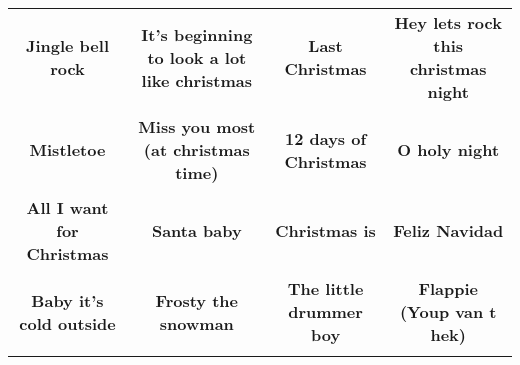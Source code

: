 \documentclass[12pt]{article} \usepackage{eso-pic, graphicx}
\newcommand{\background}[1]{%
\AddToShipoutPictureBG*{\texttt{[image: \#1]}}
}
\begin{document}
\tabcolsep=30.2pt \renewcommand{\arraystretch}{4.5}   \vspace*{4.3cm} \begin{center}  \begin{tabular}{c c c c}
\parbox{3cm}{\centering \textbf{Jingle bell rock}}& 
\parbox{3cm}{\centering \textbf{It’s beginning to look a lot like christmas}}& 
\parbox{3cm}{\centering \textbf{Last Christmas}}& 
\parbox{3cm}{\centering \textbf{Hey lets rock this christmas night}}\\ \\ 
\parbox{3cm}{\centering \textbf{Mistletoe}}& 
\parbox{3cm}{\centering \textbf{Miss you most (at christmas time)}}& 
\parbox{3cm}{\centering \textbf{12 days of Christmas}}& 
\parbox{3cm}{\centering \textbf{O holy night}}\\ \\ 
\parbox{3cm}{\centering \textbf{All I want for Christmas}}& 
\parbox{3cm}{\centering \textbf{Santa baby}}& 
\parbox{3cm}{\centering \textbf{Christmas is}}& 
\parbox{3cm}{\centering \textbf{Feliz Navidad}}\\ \\ 
\parbox{3cm}{\centering \textbf{Baby it’s cold outside}}& 
\parbox{3cm}{\centering \textbf{Frosty the snowman}}& 
\parbox{3cm}{\centering \textbf{The little drummer boy}}& 
\parbox{3cm}{\centering \textbf{Flappie (Youp van t hek)}}\\ \\ 
\end{tabular} \background{discobingo.pdf} \end{center} 
\end{document}
